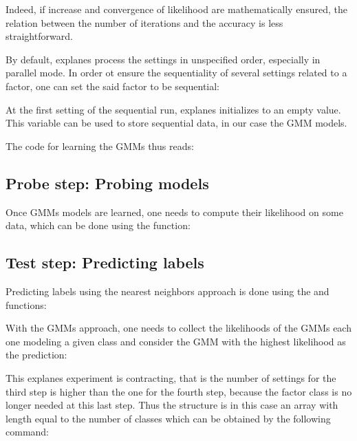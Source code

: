 \documentclass[12pt,a4paper,fleqn]{tufte-handout}
\begin{document}
Indeed, if increase and convergence of likelihood are mathematically ensured, the relation between the number of iterations and the accuracy is less straightforward. 

By default, explanes process the settings in unspecified order, especially in parallel mode. In order ot ensure the sequentiality of several settings related to a factor, one can set the said factor to be sequential:


At the first setting of the sequential run, explanes initializes  to an empty value. This variable can be used to store sequential data, in our case the GMM models.

The code for learning the GMMs thus reads:



\subsection{\textbf{Probe step}: Probing models}

Once GMMs models are learned, one needs to compute their likelihood on some data, which can be done using the  function:



\subsection{\textbf{Test step}: Predicting labels}

Predicting labels using the nearest neighbors approach is done using the  and  functions:



With the GMMs approach, one needs to collect the likelihoods of the GMMs each one modeling a given class and consider the GMM with the highest likelihood as the prediction:



This explanes experiment is contracting, that is the number of settings for the third step is higher than the one for the fourth step, because the factor class is no longer needed at this last step. Thus the  structure is in this case an array with length equal to the number of classes which can be obtained by the following command:
\end{document}
